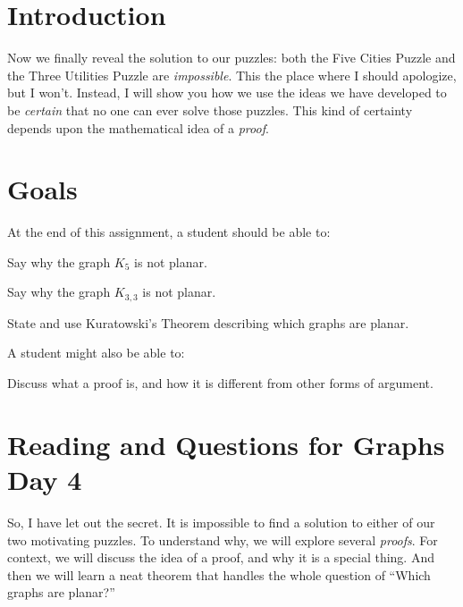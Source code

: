\documentclass[12pt,letterpaper]{article}
\theoremstyle{definition}
\begin{document}
\setlength{\parskip}{1ex plus 0.5ex minus 0.2ex}
\setlength{\parindent}{0pt}

\pagestyle{fancy}
\cfoot{}

\section*{Introduction}

Now we finally reveal the solution to our puzzles: both the Five Cities Puzzle and the Three Utilities Puzzle are 
\emph{impossible}. This the place where I should apologize, but I won't. Instead, I will show you how we use
the ideas we have developed to be \emph{certain} that no one can ever solve those puzzles. This kind of certainty
depends upon the mathematical idea of a \emph{proof}.

\section*{Goals}
At the end of this assignment, a student should be able to:
\begin{compactitem}
\item Say why the graph $K_5$ is not planar.
\item Say why the graph $K_{3,3}$ is not planar.
\item State and use Kuratowski's Theorem describing which graphs are planar.
\end{compactitem}
A student might also be able to:
\begin{compactitem}
\item Discuss what a proof is, and how it is different from other forms of argument.
\end{compactitem}

\section*{Reading and Questions for Graphs Day 4}


So, I have let out the secret. It is impossible to find a solution to either of our two motivating puzzles. 
To understand why, we will explore several \emph{proofs}. For context, we will discuss the idea of a proof, and 
why it is a special thing. And then we will learn a neat theorem that handles the whole question of ``Which graphs
are planar?''
\end{document}
